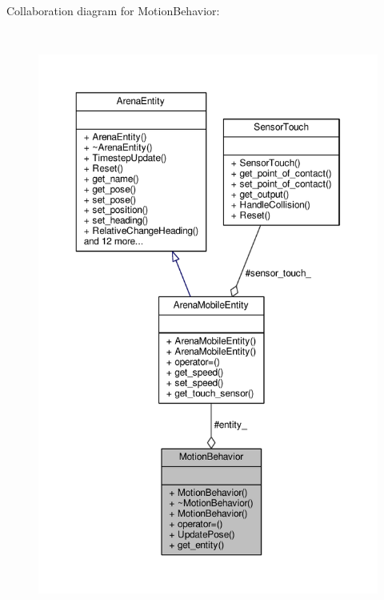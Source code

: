 Collaboration diagram for Motion\+Behavior\+:\nopagebreak
\begin{figure}[H]
\begin{center}
\leavevmode
\includegraphics[height=550pt]{classMotionBehavior__coll__graph}
\end{center}
\end{figure}

